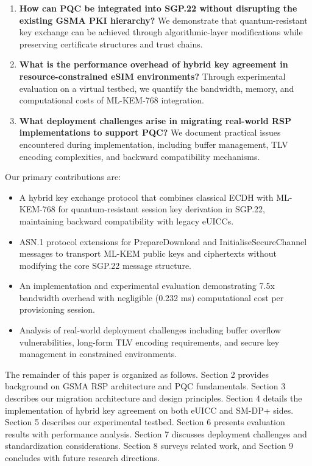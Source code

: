 \documentclass{easychair}
\begin{document}
\begin{enumerate}
\item \textbf{How can PQC be integrated into SGP.22 without disrupting the existing GSMA PKI hierarchy?} We demonstrate that quantum-resistant key exchange can be achieved through algorithmic-layer modifications while preserving certificate structures and trust chains.

\item \textbf{What is the performance overhead of hybrid key agreement in resource-constrained eSIM environments?} Through experimental evaluation on a virtual testbed, we quantify the bandwidth, memory, and computational costs of ML-KEM-768 integration.

\item \textbf{What deployment challenges arise in migrating real-world RSP implementations to support PQC?} We document practical issues encountered during implementation, including buffer management, TLV encoding complexities, and backward compatibility mechanisms.
\end{enumerate}

Our primary contributions are:

\begin{itemize}
\item A hybrid key exchange protocol that combines classical ECDH with ML-KEM-768 for quantum-resistant session key derivation in SGP.22, maintaining backward compatibility with legacy eUICCs.

\item ASN.1 protocol extensions for PrepareDownload and InitialiseSecureChannel messages to transport ML-KEM public keys and ciphertexts without modifying the core SGP.22 message structure.

\item An implementation and experimental evaluation demonstrating 7.5x bandwidth overhead with negligible (0.232 ms) computational cost per provisioning session.

\item Analysis of real-world deployment challenges including buffer overflow vulnerabilities, long-form TLV encoding requirements, and secure key management in constrained environments.
\end{itemize}

The remainder of this paper is organized as follows. Section 2 provides background on GSMA RSP architecture and PQC fundamentals. Section 3 describes our migration architecture and design principles. Section 4 details the implementation of hybrid key agreement on both eUICC and SM-DP+ sides. Section 5 describes our experimental testbed. Section 6 presents evaluation results with performance analysis. Section 7 discusses deployment challenges and standardization considerations. Section 8 surveys related work, and Section 9 concludes with future research directions.
\end{document}
